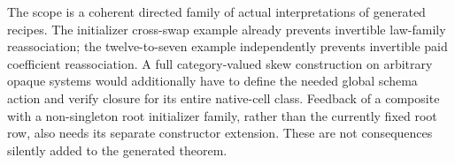 \documentclass[11pt]{article}
\begin{document}
The scope is a coherent directed family of actual interpretations of generated recipes. The initializer cross-swap example already prevents invertible law-family reassociation; the twelve-to-seven example independently prevents invertible paid coefficient reassociation. A full category-valued skew construction on arbitrary opaque systems would additionally have to define the needed global schema action and verify closure for its entire native-cell class. Feedback of a composite with a non-singleton root initializer family, rather than the currently fixed root row, also needs its separate constructor extension. These are not consequences silently added to the generated theorem.
\end{document}
